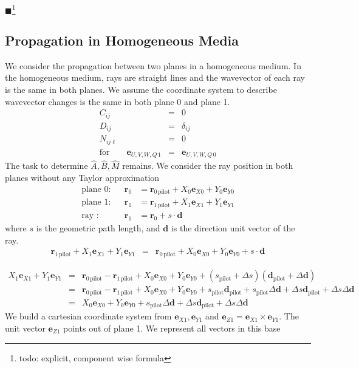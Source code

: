 \documentclass[12pt,a4paper,twoside,openright,BCOR10mm,headsepline,titlepage,abstracton,chapterprefix,final]{scrreprt}
\newcommand\Vector[1]{{\mathbf{#1}}}
\newcommand\Location{\Vector{r}}
\newcommand{\remark}[1]{{\color{red}$\blacksquare$}\footnote{{\color{red}#1}}}
\begin{document}
\remark{todo: explicit, component wise formula}

\subsection{Propagation in Homogeneous Media}
We consider the propagation between two planes in a homogeneous medium.
In the homogeneous medium, rays are straight lines and the wavevector of each ray is the same in both planes.
We assume the coordinate system to describe wavevector changes is the same in both plane 0 and plane 1.
\begin{eqnarray}
C_{ij} &=& 0 \\
D_{ij} &=& \delta_{ij} \\
N_{ij\ell} &=& 0 \\
\text{for}\qquad \Vector{e}_{U,V,W,Q\,1} &=& \Vector{e}_{U,V,W,Q\,0} \nonumber
\end{eqnarray}
The task to determine $\hat{A},\hat{B}, \hat{M}$ remains. 
We consider the ray position in both planes without any Taylor approximation
\begin{align}
 \text{plane 0:} && \Location_0 &= \Location_{0\,\text{pilot}} + X_0 \Vector{e}_{X0} + Y_0 \Vector{e}_{Y0} \\
 \text{plane 1:} && \Location_1 &= \Location_{1\,\text{pilot}} + X_1 \Vector{e}_{X1} + Y_1 \Vector{e}_{Y1} \\
 \text{ray :} && \Location_1 &= \Location_{0} + s \cdot \Vector{d}
\end{align}
where $s$ is the geometric path length, and $\Vector{d}$ is the direction unit vector of the ray.
\begin{eqnarray}
\Location_{1\,\text{pilot}} + X_1 \Vector{e}_{X1} + Y_1 \Vector{e}_{Y1} &=& \Location_{0\,\text{pilot}} + X_0 \Vector{e}_{X0} + Y_0 \Vector{e}_{Y0}  + s \cdot \Vector{d}
\end{eqnarray}

\begin{eqnarray}
  X_1 \Vector{e}_{X1} + Y_1 \Vector{e}_{Y1} 
  &=& 
  \Location_{0\,\text{pilot}} - \Location_{1\,\text{pilot}} + X_0 \Vector{e}_{X0} + Y_0 \Vector{e}_{Y0}  + (s_{\text{pilot}} + \Delta s) ( \Vector{d}_{\text{pilot}} + \Delta \Vector{d} )
\\
  &=& 
  \Location_{0\,\text{pilot}} - \Location_{1\,\text{pilot}} + X_0 \Vector{e}_{X0} + Y_0 \Vector{e}_{Y0}  
  + s_{\text{pilot}} \Vector{d}_{\text{pilot}} 
  + s_{\text{pilot}} \Delta \Vector{d} 
  + \Delta s \Vector{d}_{\text{pilot}}
  + \Delta s \Delta \Vector{d}
\\
  &=& 
  X_0 \Vector{e}_{X0} + Y_0 \Vector{e}_{Y0}  
  + s_{\text{pilot}} \Delta \Vector{d} 
  + \Delta s \Vector{d}_{\text{pilot}}
  + \Delta s \Delta \Vector{d}
\end{eqnarray}
We build a cartesian coordinate system from $\Vector{e}_{X1}, \Vector{e}_{Y1}$ and $\Vector{e}_{Z1} = \Vector{e}_{X1} \times \Vector{e}_{Y1}$.
The unit vector $\Vector{e}_{Z1}$ points out of plane 1. We represent all vectors in this base
\end{document}
